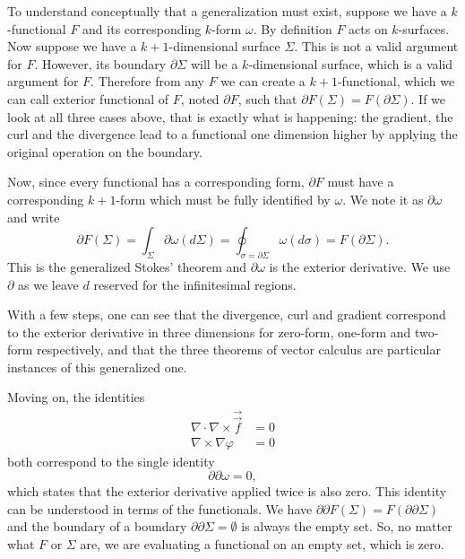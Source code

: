 \documentclass[10pt,twocolumn, nofootinbib]{revtex4-2}
\begin{document}
To understand conceptually that a generalization must exist, suppose we have a $k$-functional $F$ and its corresponding $k$-form $\omega$. By definition $F$ acts on $k$-surfaces. Now suppose we have a $k+1$-dimensional surface $\Sigma$. This is not a valid argument for $F$. However, its boundary $\partial \Sigma$ will be a $k$-dimensional surface, which is a valid argument for $F$. Therefore from any $F$ we can create a $k+1$-functional, which we can call exterior functional of $F$, noted $\partial F$, such that $\partial F(\Sigma) = F(\partial \Sigma)$. If we look at all three cases above, that is exactly what is happening: the gradient, the curl and the divergence lead to a functional one dimension higher by applying the original operation on the boundary.

Now, since every functional has a corresponding form, $\partial F$ must have a corresponding $k+1$-form which must be fully identified by $\omega$. We note it as $\partial \omega$ and write
\begin{equation*}
	\partial F(\Sigma) = \int_\Sigma \partial \omega(d\Sigma) = \oint_{\sigma = \partial \Sigma} \omega(d\sigma) = F(\partial \Sigma).
\end{equation*}
This is the generalized Stokes' theorem and $\partial \omega$ is the exterior derivative. We use $\partial$ as we leave $d$ reserved for the infinitesimal regions.

With a few steps, one can see that the divergence, curl and gradient correspond to the exterior derivative in three dimensions for zero-form, one-form and two-form respectively, and that the three theorems of vector calculus are particular instances of this generalized one.

Moving on, the identities
\begin{equation*}
	\begin{aligned}
		\nabla \cdot \nabla \times \vec \vec{f} &= 0 \\
		\nabla \times \nabla \varphi &= 0
	\end{aligned}
\end{equation*}
both correspond to the single identity
\begin{equation*}
	\partial \partial \omega = 0,
\end{equation*}
which states that the exterior derivative applied twice is also zero. This identity can be understood in terms of the functionals. We have  $\partial \partial F(\Sigma) = F(\partial \partial \Sigma)$ and the boundary of a boundary $\partial \partial \Sigma = \emptyset$ is always the empty set. So, no matter what $F$ or $\Sigma$ are, we are evaluating a functional on an empty set, which is zero.
\end{document}
